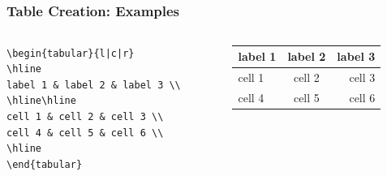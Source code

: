 \documentclass[[newPxFont]{beamer}
\begin{document}
\subsection{}
\begin{frame}[fragile]
  \frametitle{Table Creation: Examples}
\begin{columns}
\begin{column}{.5\textwidth}
\begin{small}
\begin{verbatim}
\begin{tabular}{l|c|r}
\hline
label 1 & label 2 & label 3 \\
\hline\hline
cell 1 & cell 2 & cell 3 \\
cell 4 & cell 5 & cell 6 \\
\hline
\end{tabular}
\end{verbatim}
\end{small}
\end{column}
\begin{column}{.5\textwidth}
\begin{tabular}{l|c|r}
\hline
label 1 & label 2 & label 3 \\
\hline\hline
cell 1 & cell 2 & cell 3 \\
cell 4 & cell 5 & cell 6 \\
\hline
\end{tabular}
    \end{column}
  \end{columns}
\end{frame}
\end{document}
